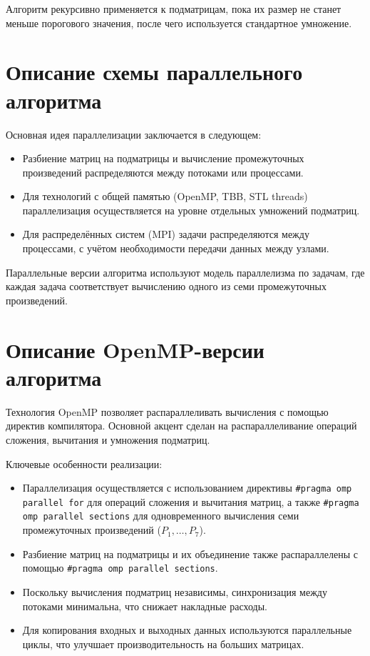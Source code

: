 \documentclass[14pt,a4paper]{extarticle}
\begin{document}
Алгоритм рекурсивно применяется к подматрицам, пока их размер не станет меньше порогового значения, после чего используется стандартное умножение.

\section{Описание схемы параллельного алгоритма}

Основная идея параллелизации заключается в следующем:

\begin{itemize}
    \item Разбиение матриц на подматрицы и вычисление промежуточных произведений распределяются между потоками или процессами.
    \item Для технологий с общей памятью (OpenMP, TBB, STL threads) параллелизация осуществляется на уровне отдельных умножений подматриц.
    \item Для распределённых систем (MPI) задачи распределяются между процессами, с учётом необходимости передачи данных между узлами.
\end{itemize}

Параллельные версии алгоритма используют модель параллелизма по задачам, где каждая задача соответствует вычислению одного из семи промежуточных произведений.

\section{Описание OpenMP-версии алгоритма}

Технология OpenMP позволяет распараллеливать вычисления с помощью директив компилятора. Основной акцент сделан на распараллеливание операций сложения, вычитания и умножения подматриц.

Ключевые особенности реализации:

\begin{itemize}
    \item Параллелизация осуществляется с использованием директивы \texttt{\#pragma omp parallel for} для операций сложения и вычитания матриц, а также \texttt{\#pragma omp parallel sections} для одновременного вычисления семи промежуточных произведений (\(P_1, \ldots, P_7\)).
    \item Разбиение матриц на подматрицы и их объединение также распараллелены с помощью \texttt{\#pragma omp parallel sections}.
    \item Поскольку вычисления подматриц независимы, синхронизация между потоками минимальна, что снижает накладные расходы.
    \item Для копирования входных и выходных данных используются параллельные циклы, что улучшает производительность на больших матрицах.
\end{itemize}
\end{document}
